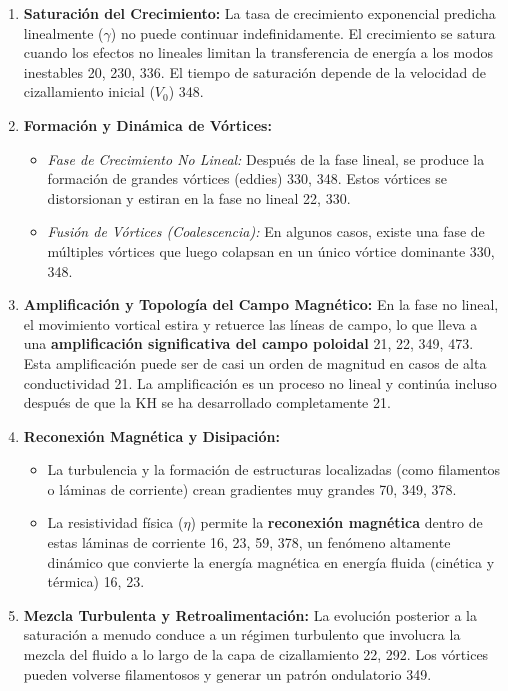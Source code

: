 \begin{enumerate}
    \item \textbf{Saturación del Crecimiento:} La tasa de crecimiento exponencial predicha linealmente ($\gamma$) no puede continuar indefinidamente. El crecimiento se satura cuando los efectos no lineales limitan la transferencia de energía a los modos inestables {20, 230, 336}. El tiempo de saturación depende de la velocidad de cizallamiento inicial ($V_0$) {348}.
    \item \textbf{Formación y Dinámica de Vórtices:}
    \begin{itemize}
        \item \textit{Fase de Crecimiento No Lineal:} Después de la fase lineal, se produce la formación de grandes vórtices (eddies) {330, 348}. Estos vórtices se distorsionan y estiran en la fase no lineal {22, 330}.
        \item \textit{Fusión de Vórtices (Coalescencia):} En algunos casos, existe una fase de múltiples vórtices que luego colapsan en un único vórtice dominante {330, 348}.
    \end{itemize}
    \item \textbf{Amplificación y Topología del Campo Magnético:} En la fase no lineal, el movimiento vortical estira y retuerce las líneas de campo, lo que lleva a una \textbf{amplificación significativa del campo poloidal} {21, 22, 349, 473}. Esta amplificación puede ser de casi un orden de magnitud en casos de alta conductividad {21}. La amplificación es un proceso no lineal y continúa incluso después de que la KH se ha desarrollado completamente {21}.
    \item \textbf{Reconexión Magnética y Disipación:}
    \begin{itemize}
        \item La turbulencia y la formación de estructuras localizadas (como filamentos o láminas de corriente) crean gradientes muy grandes {70, 349, 378}.
        \item La resistividad física ($\eta$) permite la \textbf{reconexión magnética} dentro de estas láminas de corriente {16, 23, 59, 378}, un fenómeno altamente dinámico que convierte la energía magnética en energía fluida (cinética y térmica) {16, 23}.
    \end{itemize}
    \item \textbf{Mezcla Turbulenta y Retroalimentación:} La evolución posterior a la saturación a menudo conduce a un régimen turbulento que involucra la mezcla del fluido a lo largo de la capa de cizallamiento {22, 292}. Los vórtices pueden volverse filamentosos y generar un patrón ondulatorio {349}.
\end{enumerate}

